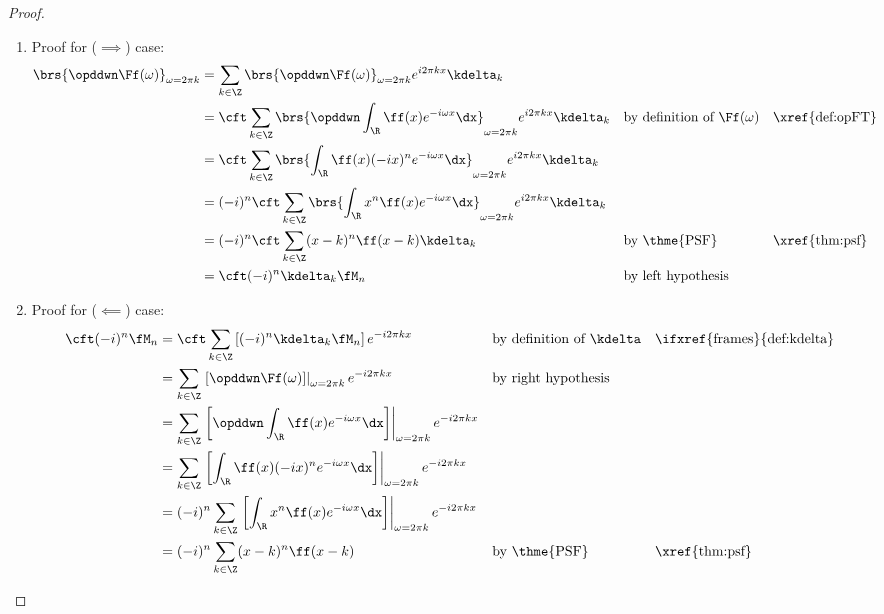 \begin{proof}
\begin{enumerate}
  \item Proof for ($\implies$) case:
    \begin{align*}
      \brs{\opddwn  \Ff(\omega)}_{\omega=2\pi k}
        &= \sum_{k\in\Z} \brs{\opddwn  \Ff(\omega)}_{\omega=2\pi k}  e^{i2\pi kx} \kdelta_k
      \\&= \cft \sum_{k\in\Z} \brs{\opddwn \int_\R  \ff(x) e^{-i\omega x} \dx}_{\omega=2\pi k} e^{i2\pi kx}  \kdelta_k
        && \text{by definition of $\Ff(\omega)$}
        && \text{\xref{def:opFT}}
      \\&= \cft \sum_{k\in\Z} \brs{\int_\R  \ff(x)(-ix)^n e^{-i\omega x} \dx}_{\omega=2\pi k} e^{i2\pi kx}  \kdelta_k
      \\&= (-i)^n \cft \sum_{k\in\Z} \brs{\int_\R  x^n \ff(x)  e^{-i\omega x} \dx}_{\omega=2\pi k} e^{i2\pi kx}  \kdelta_k
      \\&= (-i)^n \cft \sum_{k\in\Z} (x-k)^n \ff(x-k)  \kdelta_k
        && \text{by \thme{PSF}}
        && \text{\xref{thm:psf}}
      \\&= \cft (-i)^n \kdelta_k \fM_n
        && \text{by left hypothesis}
    \end{align*}

 
  \item Proof for ($\impliedby$) case:
    \begin{align*}
      \cft (-i)^n \fM_n
        &= \cft \sum_{k\in\Z} \left[(-i)^n \kdelta_k \fM_n \right] e^{-i2\pi kx}
        && \text{by definition of $\kdelta$}
        && \text{\ifxref{frames}{def:kdelta}}
      \\&= \sum_{k\in\Z} \left. 
           \left[\opddwn  \Ff(\omega)\right]\right|_{\omega=2\pi k} 
           e^{-i2\pi kx}
        && \text{by right hypothesis}
      \\&= \sum_{k\in\Z} \left. 
           \left[
           \opddwn 
           \int_\R  \ff(x) e^{-i\omega x} \dx
           \right]
           \right|_{\omega=2\pi k} e^{-i2\pi kx}
      \\&= \sum_{k\in\Z} \left. 
           \left[
           \int_\R  \ff(x)(-ix)^n e^{-i\omega x} \dx
           \right]
           \right|_{\omega=2\pi k} e^{-i2\pi kx}
      \\&= (-i)^n \sum_{k\in\Z} \left.
           \left[
           \int_\R  x^n \ff(x)  e^{-i\omega x} \dx
           \right]
           \right|_{\omega=2\pi k} e^{-i2\pi kx}
      \\&= (-i)^n \sum_{k\in\Z} (x-k)^n \ff(x-k) 
        && \text{by \thme{PSF}}
        && \text{\xref{thm:psf}}
    \end{align*}

\end{enumerate}
\end{proof}

